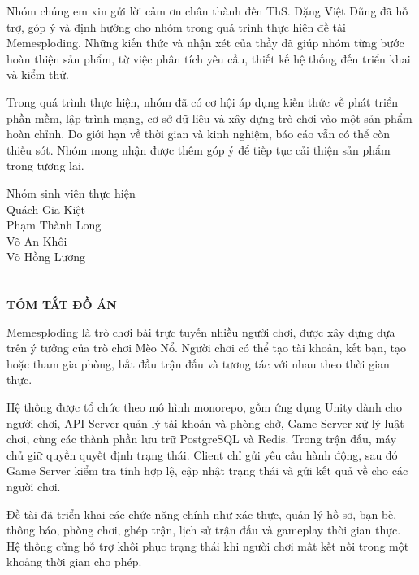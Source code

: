 \documentclass[a4paper]{report}
\begin{document}
Nhóm chúng em xin gửi lời cảm ơn chân thành đến ThS. Đặng Việt Dũng đã hỗ trợ,
góp ý và định hướng cho nhóm trong quá trình thực hiện đề tài Memesploding.
Những kiến thức và nhận xét của thầy đã giúp nhóm từng bước hoàn thiện sản phẩm,
từ việc phân tích yêu cầu, thiết kế hệ thống đến triển khai và kiểm thử.

Trong quá trình thực hiện, nhóm đã có cơ hội áp dụng kiến thức về phát triển phần
mềm, lập trình mạng, cơ sở dữ liệu và xây dựng trò chơi vào một sản phẩm hoàn
chỉnh. Do giới hạn về thời gian và kinh nghiệm, báo cáo vẫn có thể còn thiếu sót.
Nhóm mong nhận được thêm góp ý để tiếp tục cải thiện sản phẩm trong tương lai.

\vspace{1cm}
\begin{flushright}
    Nhóm sinh viên thực hiện\\
    Quách Gia Kiệt\\
    Phạm Thành Long\\
    Võ An Khôi\\
    Võ Hồng Lương
\end{flushright}

\newpage
\tableofcontents
\newpage

\chapter*{}
\begin{center}
    \Large\bfseries TÓM TẮT ĐỒ ÁN
\end{center}

\setcounter{page}{1}
\pagestyle{fancy}

Memesploding là trò chơi bài trực tuyến nhiều người chơi, được xây dựng dựa trên
ý tưởng của trò chơi Mèo Nổ. Người chơi có thể tạo tài khoản, kết bạn, tạo hoặc
tham gia phòng, bắt đầu trận đấu và tương tác với nhau theo thời gian thực.

Hệ thống được tổ chức theo mô hình monorepo, gồm ứng dụng Unity dành cho người
chơi, API Server quản lý tài khoản và phòng chờ, Game Server xử lý luật chơi,
cùng các thành phần lưu trữ PostgreSQL và Redis. Trong trận đấu, máy chủ giữ
quyền quyết định trạng thái. Client chỉ gửi yêu cầu hành động, sau đó Game Server
kiểm tra tính hợp lệ, cập nhật trạng thái và gửi kết quả về cho các người chơi.

Đề tài đã triển khai các chức năng chính như xác thực, quản lý hồ sơ, bạn bè,
thông báo, phòng chơi, ghép trận, lịch sử trận đấu và gameplay thời gian thực.
Hệ thống cũng hỗ trợ khôi phục trạng thái khi người chơi mất kết nối trong một
khoảng thời gian cho phép.
\end{document}
